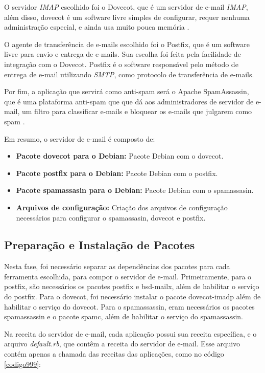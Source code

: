 O servidor \textit{IMAP} escolhido foi o Dovecot, que é um servidor de e-mail
\textit{IMAP}, além disso, dovecot é um software livre simples de configurar, requer nenhuma
administração especial, e ainda usa muito pouca memória \cite{dovecot}. 

O agente de transferência de e-mails escolhido foi o Postfix, que é um software
livre para envio e entrega de e-mails. Sua escolha foi feita pela facilidade de
integração com o Dovecot. Postfix é o software responsável pelo método de entrega de e-mail
utilizando \textit{SMTP}, como protocolo de transferência de e-mails. 

Por fim, a aplicação que servirá como anti-spam será o Apache SpamAssassin, que 
é uma plataforma anti-spam que que dá aos administradores de servidor de e-mail, 
um filtro para classificar e-mails e bloquear os e-mails que julgarem como spam \cite{spam}. 

Em resumo, o servidor de e-mail é composto de:

\begin{itemize}
   \item \textbf{Pacote dovecot para o Debian:} Pacote Debian com o dovecot.
   \item \textbf{Pacote postfix para o Debian:} Pacote Debian com o postfix.
   \item \textbf{Pacote spamassasin para o Debian:} Pacote Debian com o spamassasin.
   \item \textbf{Arquivos de configuração:} Criação dos arquivos de configuração
   necessários para configurar o spamassasin, dovecot e postfix.
\end{itemize}

\subsection{Preparação e Instalação de Pacotes }

Nesta fase, foi necessário separar as dependências dos pacotes para cada ferramenta
escolhida, para compor o servidor de e-mail. Primeiramente, para o postfix, são necessários
os pacotes postfix e bsd-mailx, além de habilitar o serviço do postfix. Para o dovecot,
foi necessário instalar o pacote dovecot-imadp além de habilitar o serviço do dovecot. 
Para o spamassassin, eram necessários os pacotes spamassassin e o pacote spamc, além 
de habilitar o serviço do spamassassin.

Na receita do servidor de e-mail, cada aplicação possui sua receita específica,
e o arquivo \textit{default.rb}, que contêm a receita do servidor de e-mail. Esse arquivo
contém apenas a chamada das receitas das aplicações, como no código \ref{codigo999}:

